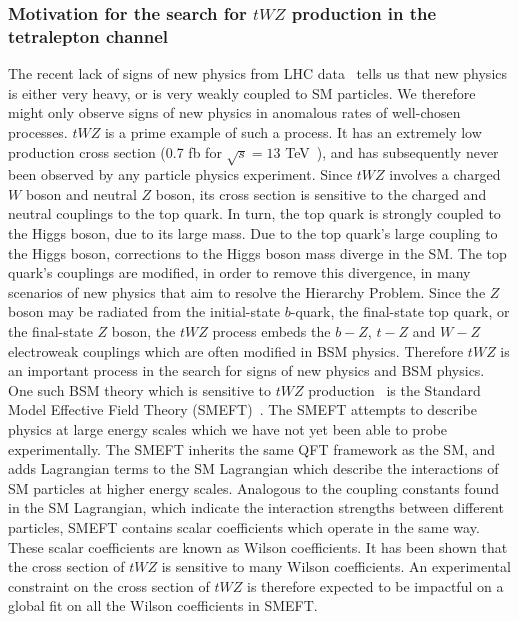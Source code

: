 \subsubsection{Motivation for the search for $tWZ$ production in the tetralepton channel}
The recent lack of signs of new physics from LHC data~\cite{sonneveld2019searches} tells us that new physics is either very heavy, or is very weakly coupled to SM particles. We therefore might only observe signs of new physics in anomalous rates of well-chosen processes. $tWZ$ is a prime example of such a process. It has an extremely low production cross section (0.7 fb for $\sqrt{s}= 13$ TeV~\cite{twz-theory-paper}), and has subsequently never been observed by any particle physics experiment. Since $tWZ$ involves a charged $W$ boson and neutral $Z$ boson, its cross section is sensitive to the charged and neutral couplings to the top quark. In turn, the top quark is strongly coupled to the Higgs boson, due to its large mass. Due to the top quark's large coupling to the Higgs boson, corrections to the Higgs boson mass diverge in the SM. The top quark's couplings are modified, in order to remove this divergence, in many scenarios of new physics that aim to resolve the Hierarchy Problem. Since the $Z$ boson may be radiated from the initial-state $b$-quark, the final-state top quark, or the final-state $Z$ boson, the $tWZ$ process embeds the $b-Z$, $t-Z$ and $W-Z$ electroweak couplings which are often modified in BSM physics. Therefore $tWZ$ is an important process in the search for signs of new physics and BSM physics.\\ %

One such BSM theory which is sensitive to $tWZ$ production~\cite{Maltoni_2019, mimasu2021quark} is the Standard Model Effective Field Theory (SMEFT)~\cite{Brivio_2019}. The SMEFT attempts to describe physics at large energy scales which we have not yet been able to probe experimentally. The SMEFT inherits the same QFT framework as the SM, and adds Lagrangian terms to the SM Lagrangian which describe the interactions of SM particles at higher energy scales. Analogous to the coupling constants found in the SM Lagrangian, which indicate the interaction strengths between different particles, SMEFT contains scalar coefficients which operate in the same way. These scalar coefficients are known as Wilson coefficients. It has been shown that the cross section of $tWZ$ is sensitive to many Wilson coefficients. An experimental constraint on the cross section of $tWZ$ is therefore expected to be impactful on a global fit on all the Wilson coefficients in SMEFT.\\

